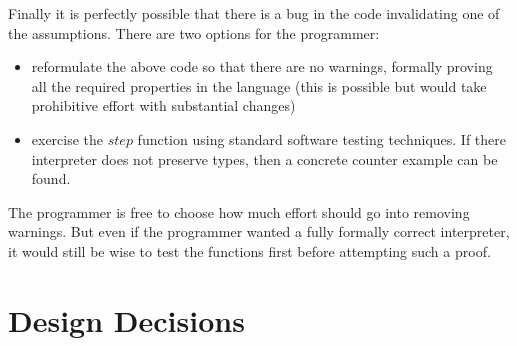 Finally it is perfectly possible that there is a bug in the code invalidating one of the assumptions.
There are two options for the programmer:
\begin{itemize}
\item reformulate the above code so that there are no warnings, formally proving all the required properties in the language (this is possible but would take prohibitive effort with substantial changes)
\item exercise the $step$ function using standard software testing techniques.
If there interpreter does not preserve types, then a concrete counter example can be found.
\end{itemize}
The programmer is free to choose how much effort should go into removing warnings.
But even if the programmer wanted a fully formally correct interpreter, it would still be wise to test the functions first before attempting such a proof.



\section{Design Decisions}

